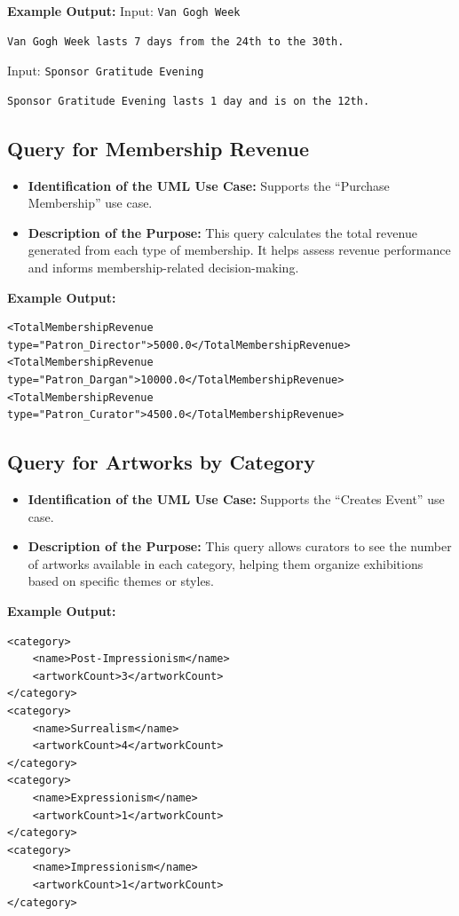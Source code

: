 \documentclass{article} %
\begin{document}
\textbf{Example Output:}  
Input: \texttt{Van Gogh Week}  
\begin{verbatim}
Van Gogh Week lasts 7 days from the 24th to the 30th.
\end{verbatim}

Input: \texttt{Sponsor Gratitude Evening}  
\begin{verbatim}
Sponsor Gratitude Evening lasts 1 day and is on the 12th.
\end{verbatim}

\subsection{Query for Membership Revenue}
\begin{itemize}
    \item \textbf{Identification of the UML Use Case:} Supports the ``Purchase Membership'' use case.
    \item \textbf{Description of the Purpose:} This query calculates the total revenue generated from each type of membership. It helps assess revenue performance and informs membership-related decision-making.
\end{itemize}

\textbf{Example Output:}
\begin{verbatim}
<TotalMembershipRevenue type="Patron_Director">5000.0</TotalMembershipRevenue>
<TotalMembershipRevenue type="Patron_Dargan">10000.0</TotalMembershipRevenue>
<TotalMembershipRevenue type="Patron_Curator">4500.0</TotalMembershipRevenue>
\end{verbatim}

\subsection{Query for Artworks by Category}
\begin{itemize}
    \item \textbf{Identification of the UML Use Case:} Supports the ``Creates Event'' use case.
    \item \textbf{Description of the Purpose:} This query allows curators to see the number of artworks available in each category, helping them organize exhibitions based on specific themes or styles.
\end{itemize}

\textbf{Example Output:}
\begin{verbatim}
<category>
    <name>Post-Impressionism</name>
    <artworkCount>3</artworkCount>
</category>
<category>
    <name>Surrealism</name>
    <artworkCount>4</artworkCount>
</category>
<category>
    <name>Expressionism</name>
    <artworkCount>1</artworkCount>
</category>
<category>
    <name>Impressionism</name>
    <artworkCount>1</artworkCount>
</category>
\end{verbatim}
\end{document}
